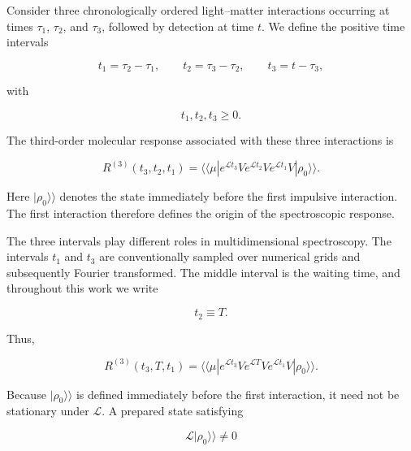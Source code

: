\documentclass[11pt]{article}
\begin{document}
Consider three chronologically ordered light--matter interactions
occurring at times $\tau_1$, $\tau_2$, and $\tau_3$, followed by
detection at time $t$. We define the positive time intervals

\begin{equation}
t_1
=
\tau_2-\tau_1,
\qquad
t_2
=
\tau_3-\tau_2,
\qquad
t_3
=
t-\tau_3,
\label{eq:time_intervals}
\end{equation}

with

\begin{equation}
t_1,t_2,t_3\geq0.
\end{equation}

The third-order molecular response associated with these three
interactions is

\begin{equation}
\boxed{
R^{(3)}(t_3,t_2,t_1)
=
\langle\!\langle\mu|
e^{\mathcal{L}t_3}
V
e^{\mathcal{L}t_2}
V
e^{\mathcal{L}t_1}
V
|\rho_0\rangle\rangle.
}
\label{eq:third_order_response}
\end{equation}

Here $|\rho_0\rangle\rangle$ denotes the state immediately before the
first impulsive interaction. The first interaction therefore defines
the origin of the spectroscopic response.

The three intervals play different roles in multidimensional
spectroscopy. The intervals $t_1$ and $t_3$ are conventionally sampled
over numerical grids and subsequently Fourier transformed. The middle
interval is the waiting time, and throughout this work we write

\begin{equation}
t_2\equiv T.
\end{equation}

Thus,

\begin{equation}
\boxed{
R^{(3)}(t_3,T,t_1)
=
\langle\!\langle\mu|
e^{\mathcal{L}t_3}
V
e^{\mathcal{L}T}
V
e^{\mathcal{L}t_1}
V
|\rho_0\rangle\rangle.
}
\label{eq:third_order_response_T}
\end{equation}

Because $|\rho_0\rangle\rangle$ is defined immediately before the
first interaction, it need not be stationary under $\mathcal{L}$.
A prepared state satisfying

\begin{equation}
\mathcal{L}|\rho_0\rangle\rangle\neq0
\end{equation}
\end{document}

